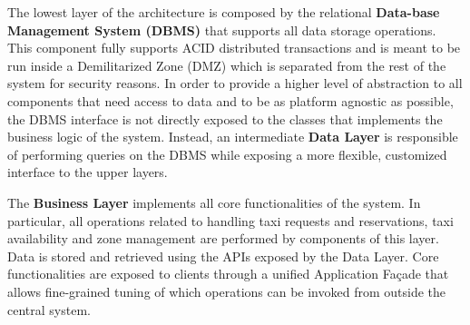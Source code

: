 \begin{figure}[H]
\centering
{}
\end{figure}
\vspace{5mm}
The lowest layer of the architecture is composed by the relational \textbf{Data-base Management System (DBMS)} that supports all data storage operations. This component fully supports ACID distributed transactions and is meant to be run inside a Demilitarized Zone (DMZ) which is separated from the rest of the system for security reasons.
In order to provide a higher level of abstraction to all components that need access to data and to be as platform agnostic as possible, the DBMS interface is not directly exposed to the classes that implements the business logic of the system. Instead, an intermediate \textbf{Data Layer} is responsible of performing queries on the DBMS while exposing a more flexible, customized interface to the upper layers.

The \textbf{Business Layer} implements all core functionalities of the system. In particular, all operations related to handling taxi requests and reservations, taxi availability and zone management are performed by components of this layer. Data is stored and retrieved using the APIs exposed by the Data Layer. Core functionalities are exposed to clients through a unified Application Façade that allows fine-grained tuning of which operations can be invoked from outside the central system.


